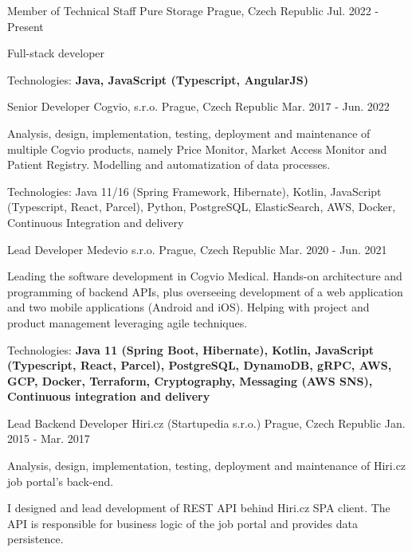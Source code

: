 \begin{cventries}
  \cventry
    {Member of Technical Staff}
    {Pure Storage}
    {Prague, Czech Republic}
    {Jul. 2022 - Present}
    {
    \begin{cvitems}
      \item {Full-stack developer}
      \item {Technologies: \textbf{Java, JavaScript (Typescript, AngularJS)}}
    \end{cvitems}
  }
  \cventry
    {Senior Developer}
    {Cogvio, s.r.o.}
    {Prague, Czech Republic}
    {Mar. 2017 - Jun. 2022}
    {
    \begin{cvitems}
      \item {Analysis, design, implementation, testing, deployment and maintenance of multiple Cogvio products, namely Price Monitor, Market Access Monitor and Patient Registry. Modelling and automatization of data processes.}
      \item {Technologies: Java 11/16 (Spring Framework, Hibernate), Kotlin, JavaScript (Typescript, React, Parcel), Python, PostgreSQL, ElasticSearch, AWS, Docker, Continuous Integration and delivery}
    \end{cvitems}
  }
  \cventry
    {Lead Developer}
    {Medevio s.r.o.}
    {Prague, Czech Republic}
    {Mar. 2020 - Jun. 2021}
    {
    \begin{cvitems}
      \item {Leading the software development in Cogvio Medical. Hands-on architecture and programming of backend APIs, plus overseeing development of a web application and two mobile applications (Android and iOS).
       Helping with project and product management leveraging agile techniques.}
      \item {Technologies: \textbf{Java 11 (Spring Boot, Hibernate), Kotlin, JavaScript (Typescript, React, Parcel), PostgreSQL, DynamoDB, gRPC, AWS, GCP, Docker, Terraform, Cryptography, Messaging (AWS SNS), Continuous integration and delivery}}
    \end{cvitems}
  }
  \cventry
    {Lead Backend Developer}
    {Hiri.cz (Startupedia s.r.o.)}
    {Prague, Czech Republic}
    {Jan. 2015 - Mar. 2017}
    {
      \begin{cvitems}
        \item {Analysis, design, implementation, testing, deployment and maintenance of Hiri.cz job portal's back-end.}
        \item {I designed and lead development of REST API behind Hiri.cz SPA client. The API is responsible for business logic of the job portal and provides data persistence.}

\end{cvitems}}
\end{cventries}
